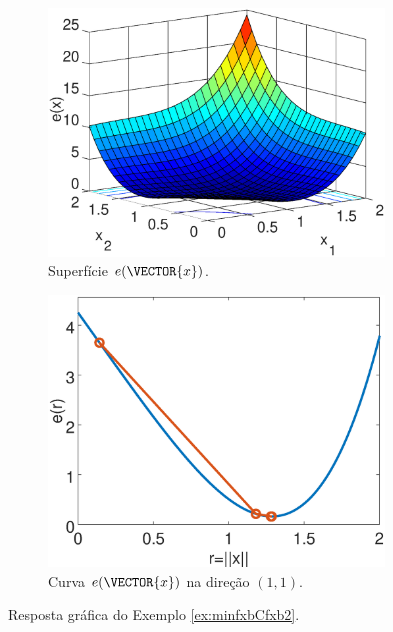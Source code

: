 \begin{figure}[h!]
     \centering
     \begin{subfigure}[b]{0.49\textwidth}
         \centering
         \includegraphics[width=0.98\textwidth]{chapters/minimization-fx/mfiles/fx1/surfcfx2.eps}
         \caption{Superfície $e(\VECTOR{x})$. }
         \label{fig:ex:minfxbCfxb2:a}
     \end{subfigure}
     \hfill
     \begin{subfigure}[b]{0.49\textwidth}
         \centering
         \includegraphics[width=0.98\textwidth]{chapters/minimization-fx/mfiles/fx1/plotfx2.eps}
         \caption{Curva $e(\VECTOR{x})$ na direção $(1,1)$.}
         \label{fig:ex:minfxbCfxb2:b}
     \end{subfigure}
        \caption{Resposta gráfica do Exemplo \ref{ex:minfxbCfxb2}. }
        \label{fig:ex:minfxbCfxb2}
\end{figure}


